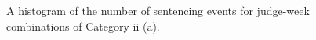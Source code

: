 \documentclass[11pt, oneside]{article}   	%
\theoremstyle{ModifiedStyle}
\begin{document}
\begin{figure}[H]
\begin{minipage}{0.45\textwidth}
					\vspace{-6mm}
					\caption{A histogram of the number of sentencing events for judge-week combinations of Category ii (a).}
					\label{Figure_Histogram_of_Sentences_This_Week_Category_10}
				\end{minipage}
			\end{figure}

\end{document}
